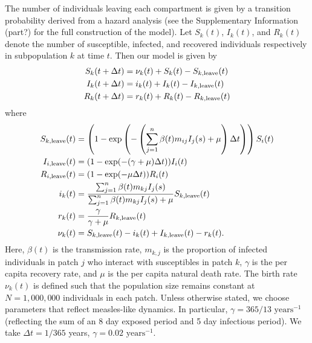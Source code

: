 \documentclass[12pt]{article}
\begin{document}
The number of individuals leaving each compartment is given by a transition probability derived from a hazard analysis (see the Supplementary Information (part?) for the full construction of the model). Let $S_k(t)$, $I_k(t)$, and $R_k(t)$ denote the number of susceptible, infected, and recovered individuals respectively in subpopulation $k$ at time $t$. Then our model is given by 
\begin{equation}
\label{eq:discretedeterministic}
\begin{aligned}
S_{k}(t+\Delta t) &= \nu_k(t) + S_k(t) - S_{k, \tiny{\textrm{leave}}}(t)\\
I_{k}(t+\Delta t) &= i_k(t) + I_k(t) - I_{k, \tiny{\textrm{leave}}}(t)\\
R_{k}(t+\Delta t) &= r_k(t) + R_k(t) - R_{k, \tiny{\textrm{leave}}}(t)
\end{aligned}
\end{equation}
where 
\begin{equation} \label{eq:SIR-det}
\begin{aligned}
S_{k, {\tiny\textrm{leave}}}(t) &= \left(1 - \exp \left(-\left(\sum_{j=1}^n \beta(t) m_{ij} I_j(s) + \mu \right) \Delta t \right) \right) S_i(t)\\
I_{i, \tiny{\textrm{leave}}}(t) &= (1 - \exp(-(\gamma + \mu)\Delta t)) I_i(t) \\
R_{i, \tiny{\textrm{leave}}}(t) &= (1 - \exp(-\mu \Delta t)) R_i(t) \\
i_k(t) &= \frac{\sum_{j=1}^n \beta(t) m_{kj} I_j(s)}{\sum_{j=1}^n \beta(t) m_{kj} I_j(s) + \mu} S_{k, \tiny{\textrm{leave}}}(t)\\
r_k(t) &= \frac{\gamma}{\gamma + \mu} R_{k, \tiny{\textrm{leave}}}(t)\\
\nu_k(t) &= S_{k, \tiny{\textrm{leave}}}(t) - i_k(t) + I_{k, \tiny{\textrm{leave}}}(t) - r_k(t).
\end{aligned}
\end{equation}
Here, $\beta(t)$ is the transmission rate, $m_{k,j}$ is the proportion of infected individuals in patch $j$ who interact with susceptibles in patch $k$, $\gamma$ is the per capita recovery rate, and $\mu$ is the per capita natural death rate. The birth rate $\nu_k(t)$ is defined such that the population size remains constant at $N = 1,000, 000$ individuals in each patch. Unless otherwise stated, we choose parameters that reflect measles-like dynamics. In particular, $\gamma = 365/13 \textrm{ years}^{-1}$ (reflecting the sum of an 8 day exposed period and 5 day infectious period). We take $\Delta t = 1/365$ years, $\gamma = 0.02 \textrm{ years}^{-1}$.
\end{document}
